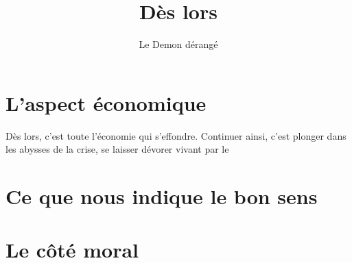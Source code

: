 \documentclass[french,amstex,12pt,a5paper]{book}
\begin{document}
\title{Dès lors}
\author{Le Demon dérangé}
\maketitle

\tableofcontents

\chapter{L'aspect économique}


Dès lors, c'est toute l'économie qui s'effondre. Continuer ainsi, c'est plonger dans les abysses de la crise, se laisser dévorer vivant par le 


\chapter{Ce que nous indique le bon sens}





\chapter{Le côté moral}
\end{document}
